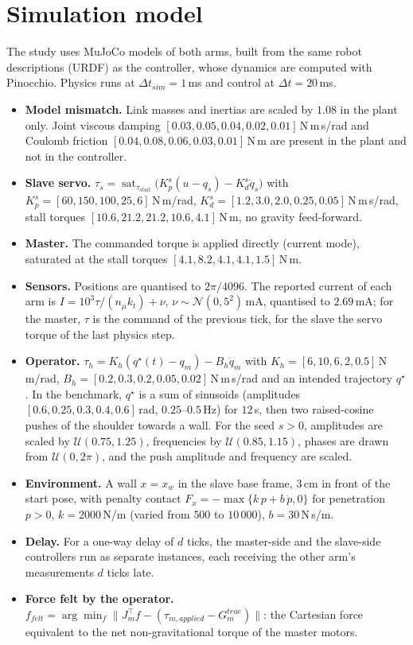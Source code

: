 \documentclass[11pt,a4paper]{article}
\theoremstyle{remark}
\theoremstyle{definition}
\newcommand{\sat}{\operatorname{sat}}
\begin{document}
\section{Simulation model}\label{sec:sim}
The study uses MuJoCo models of both arms, built from the same robot descriptions (URDF) as the controller, whose dynamics are computed with Pinocchio. Physics runs at $\Delta t_{sim}=1$\,ms and
control at $\Delta t=20$\,ms.
\begin{itemize}[leftmargin=*,itemsep=2pt]
\item \textbf{Model mismatch.} Link masses and inertias are scaled by $1.08$ in the plant only. Joint viscous damping $[0.03,0.05,0.04,0.02,0.01]$\,N\,m\,s/rad and Coulomb friction
$[0.04,0.08,0.06,0.03,0.01]$\,N\,m are present in the plant and not in the controller.
\item \textbf{Slave servo.} $\tau_s=\sat_{\tau_{stall}}\big(K_p^{s}(u-q_s)-K_d^{s}\dot q_s\big)$ with $K_p^{s}=[60,150,100,25,6]$\,N\,m/rad, $K_d^{s}=[1.2,3.0,2.0,0.25,0.05]$\,N\,m\,s/rad,
stall torques $[10.6,21.2,21.2,10.6,4.1]$\,N\,m, no gravity feed-forward.
\item \textbf{Master.} The commanded torque is applied directly (current mode), saturated at the stall torques $[4.1,8.2,4.1,4.1,1.5]$\,N\,m.
\item \textbf{Sensors.} Positions are quantised to $2\pi/4096$. The reported current of each arm is $I=10^3\tau/(n_\mu k_t)+\nu$, $\nu\sim\mathcal N(0,5^2)$\,mA, quantised to $2.69$\,mA; for the master, $\tau$
is the command of the previous tick, for the slave the servo torque of the last physics step.
\item \textbf{Operator.} $\tau_h=K_h(q^{\star}(t)-q_m)-B_h\dot q_m$ with $K_h=[6,10,6,2,0.5]$\,N\,m/rad, $B_h=[0.2,0.3,0.2,0.05,0.02]$\,N\,m\,s/rad and an intended trajectory $q^\star$.
In the benchmark, $q^\star$ is a sum of sinusoids (amplitudes $[0.6,0.25,0.3,0.4,0.6]$\,rad, $0.25$--$0.5$\,Hz) for $12$\,s, then two raised-cosine pushes of the shoulder towards a wall.
For the seed $s>0$, amplitudes are scaled by $\mathcal U(0.75,1.25)$, frequencies by $\mathcal U(0.85,1.15)$, phases are drawn from $\mathcal U(0,2\pi)$, and the push amplitude and frequency are scaled.
\item \textbf{Environment.} A wall $x=x_w$ in the slave base frame, $3$\,cm in front of the start pose, with penalty contact $F_x=-\max\{k\,p+b\,\dot p,0\}$ for penetration $p>0$, $k=2000$\,N/m (varied
from $500$ to $10\,000$), $b=30$\,N\,s/m.
\item \textbf{Delay.} For a one-way delay of $d$ ticks, the master-side and the slave-side controllers run as separate instances, each receiving the other arm's measurements $d$ ticks late.
\item \textbf{Force felt by the operator.} $f_{felt}=\arg\min_f\|J_m^\top f-(\tau_{m,applied}-G_m^{true})\|$: the Cartesian force equivalent to the net non-gravitational torque of the master motors.
\end{itemize}
\end{document}
